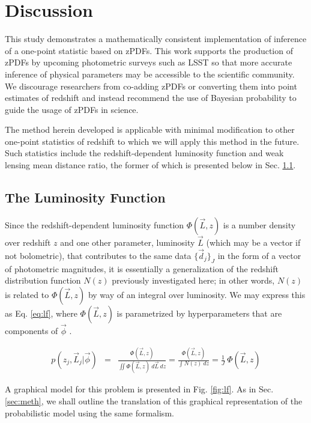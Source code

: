 \documentclass[preprint]{aastex}
\begin{document}
\clearpage
\section{Discussion}
\label{sec:disc}

This study demonstrates a mathematically consistent implementation of inference of a one-point statistic based on zPDFs.  This work supports the production of zPDFs by upcoming photometric surveys such as LSST so that more accurate inference of physical parameters may be accessible to the scientific community.  We discourage researchers from co-adding zPDFs or converting them into point estimates of redshift and instead recommend the use of Bayesian probability to guide the usage of zPDFs in science.

The method herein developed is applicable with minimal modification to other one-point statistics of redshift to which we will apply this method in the future.  Such statistics include the redshift-dependent luminosity function and weak lensing mean distance ratio, the former of which is presented below in Sec. \ref{sec:lf}.

\clearpage
\subsection{The Luminosity Function}
\label{sec:lf}

Since the redshift-dependent luminosity function $\Phi(\vec{L},z)$ is a number density over redshift $z$ and one other parameter, luminosity $\vec{L}$ (which may be a vector if not bolometric), that contributes to the same data $\{\vec{d}_{j}\}_{J}$ in the form of a vector of photometric magnitudes, it is essentially a generalization of the redshift distribution function $N(z)$ previously investigated here; in other words, $N(z)$ is related to $\Phi(\vec{L},z)$ by way of an integral over luminosity.   We may express this as Eq. \ref{eq:lf}, where $\Phi(\vec{L},z)$ is parametrized by hyperparameters that are components of $\vec{\phi}$ .

\begin{eqnarray}
\label{eq:lf}
p(z_{j},\vec{L}_{j}|\vec{\phi}) &=& \frac{\Phi(\vec{L},z)}{\iint \Phi(\vec{L},z)\ d\vec{L}\ dz} = \frac{\Phi(\vec{L},z)}{\int N(z)\ dz} = \frac{1}{J}\ \Phi(\vec{L},z)
\end{eqnarray}

A graphical model for this problem is presented in Fig. \ref{fig:lf}.  As in Sec. \ref{sec:meth}, we shall outline the translation of this graphical representation of the probabilistic model using the same formalism.
\end{document}
